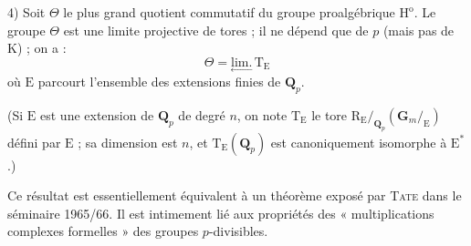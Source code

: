 4) Soit $\Theta$ le plus grand quotient commutatif du groupe proalgébrique $\mathrm{H}^{\mathrm{o}}$. Le groupe $\Theta$ est une limite projective de tores ; il ne dépend que de $p$ (mais pas de $\mathrm{K}$) ; on a :
\[
\Theta=\underset{\leftarrow}{\mathrm{lim.}}\,\mathrm{T}_{\mathrm{E}}
\]
où $\mathrm{E}$ parcourt l’ensemble des extensions finies de $\mathbf{Q}_p$.

(Si $\mathrm{E}$ est une extension de $\mathbf{Q}_p$ de degré $n$, on note $\mathrm{T}_{\mathrm{E}}$ le tore $\mathrm{R}_{\mathrm{E}}/_{\mathbf{Q}_p}(\mathbf{G}_m/_{\mathrm{E}})$ défini par $\mathrm{E}$ ; sa dimension est $n$, et $\mathrm{T}_{\mathrm{E}}(\mathbf{Q}_p)$ est canoniquement isomorphe à $\mathrm{E}^{*}$.)

Ce résultat est essentiellement équivalent à un théorème exposé par \textsc{Tate} dans le séminaire 1965/66. Il est intimement lié aux propriétés des « multiplications complexes formelles » des groupes $p$-divisibles.
